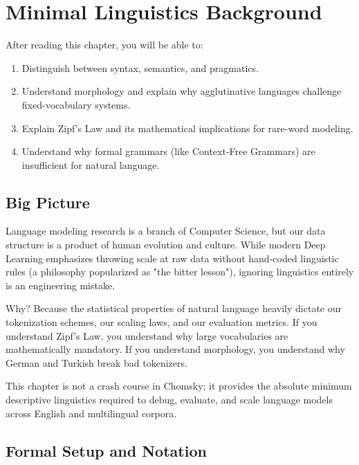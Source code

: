 \chapter{Minimal Linguistics Background}
\label{ch:05}

\begin{keyinsight}
After reading this chapter, you will be able to:
\begin{enumerate}
  \item Distinguish between syntax, semantics, and pragmatics.
  \item Understand morphology and explain why agglutinative languages challenge fixed-vocabulary systems.
  \item Explain Zipf's Law and its mathematical implications for rare-word modeling.
  \item Understand why formal grammars (like Context-Free Grammars) are insufficient for natural language.
\end{enumerate}
\end{keyinsight}

\section{Big Picture}
\label{ch:05:sec:big_picture}

Language modeling research is a branch of Computer Science, but our data structure is a product of human evolution and culture. While modern Deep Learning emphasizes throwing scale at raw data without hand-coded linguistic rules (a philosophy popularized as "the bitter lesson"), ignoring linguistics entirely is an engineering mistake.

Why? Because the statistical properties of natural language heavily dictate our tokenization schemes, our scaling laws, and our evaluation metrics. If you understand Zipf's Law, you understand why large vocabularies are mathematically mandatory. If you understand morphology, you understand why German and Turkish break bad tokenizers. 

This chapter is not a crash course in Chomsky; it provides the absolute minimum descriptive linguistics required to debug, evaluate, and scale language models across English and multilingual corpora.

\section{Formal Setup and Notation}
\label{ch:05:sec:setup}

